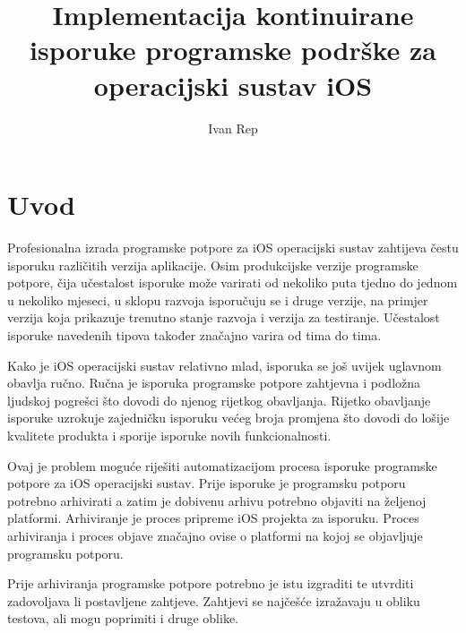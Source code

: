 \documentclass[times, utf8, diplomski, numeric]{fer}
\begin{document}

\title{Implementacija kontinuirane isporuke programske podrške za operacijski sustav iOS}

\author{Ivan Rep}

\maketitle

\izvornik


\tableofcontents

\chapter{Uvod}

Profesionalna izrada programske potpore za iOS operacijski sustav zahtijeva čestu isporuku različitih verzija aplikacije. Osim produkcijske verzije programske potpore, čija učestalost isporuke može varirati od nekoliko puta tjedno do jednom u nekoliko mjeseci, u sklopu razvoja isporučuju se i druge verzije, na primjer verzija koja prikazuje trenutno stanje razvoja i verzija za testiranje. Učestalost isporuke navedenih tipova također značajno varira od tima do tima.

Kako je iOS operacijski sustav relativno mlad, isporuka se još uvijek uglavnom obavlja ručno. Ručna je isporuka programske potpore zahtjevna i podložna ljudskoj pogrešci što dovodi do njenog rijetkog obavljanja.   Rijetko obavljanje isporuke uzrokuje zajedničku isporuku većeg broja promjena što dovodi do lošije kvalitete produkta i sporije isporuke novih funkcionalnosti.

Ovaj je problem moguće riješiti automatizacijom procesa isporuke programske potpore za iOS operacijski sustav. Prije isporuke je programsku potporu potrebno arhivirati a zatim je dobivenu arhivu potrebno objaviti na željenoj platformi. Arhiviranje je proces pripreme iOS projekta za isporuku. Proces arhiviranja i proces objave značajno ovise o platformi na kojoj se objavljuje programsku potporu.

Prije arhiviranja programske potpore potrebno je istu izgraditi te utvrditi zadovoljava li postavljene zahtjeve. Zahtjevi se najčešće izražavaju u obliku testova, ali mogu poprimiti i druge oblike.
\end{document}

